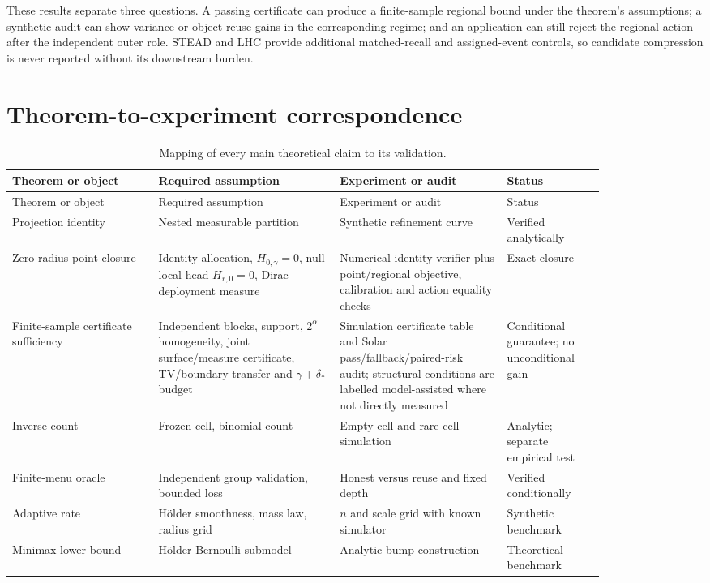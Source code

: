 \documentclass[11pt,a4paper]{article}
\numberwithin{equation}{section}
\theoremstyle{definition}\newtheorem{definition}[theorem]{Definition}
\theoremstyle{remark}\newtheorem{remark}[theorem]{Remark}
\begin{document}
These results separate three questions. A passing certificate can produce a
finite-sample regional bound under the theorem's assumptions; a synthetic audit
can show variance or object-reuse gains in the corresponding regime; and an
application can still reject the regional action after the independent outer
role. STEAD and LHC provide additional matched-recall and assigned-event
controls, so candidate compression is never reported without its downstream
burden.

\section{Theorem-to-experiment correspondence}\label{sec:matrix}
\begin{longtable}{L{0.21\linewidth}L{0.26\linewidth}L{0.24\linewidth}L{0.14\linewidth}}
\caption{Mapping of every main theoretical claim to its validation.}\\
\toprule
Theorem or object & Required assumption & Experiment or audit & Status\\
\midrule
\endfirsthead
\toprule
Theorem or object & Required assumption & Experiment or audit & Status\\
\midrule
\endhead
Projection identity & Nested measurable partition & Synthetic refinement curve & Verified analytically\\
Zero-radius point closure & Identity allocation, $H_{0,\gamma}=0$, null local head $H_{r,0}=0$, Dirac deployment measure & Numerical identity verifier plus point/regional objective, calibration and action equality checks & Exact closure\\
Finite-sample certificate sufficiency & Independent blocks, support, $2^\alpha$ homogeneity, joint surface/measure certificate, TV/boundary transfer and $\gamma+\delta_*$ budget & Simulation certificate table and Solar pass/fallback/paired-risk audit; structural conditions are labelled model-assisted where not directly measured & Conditional guarantee; no unconditional gain\\
Inverse count & Frozen cell, binomial count & Empty-cell and rare-cell simulation & Analytic; separate empirical test\\
Finite-menu oracle & Independent group validation, bounded loss & Honest versus reuse and fixed depth & Verified conditionally\\
Adaptive rate & Hölder smoothness, mass law, radius grid & $n$ and scale grid with known simulator & Synthetic benchmark\\
Minimax lower bound & Hölder Bernoulli submodel & Analytic bump construction & Theoretical benchmark\\

\end{longtable}
\end{document}

